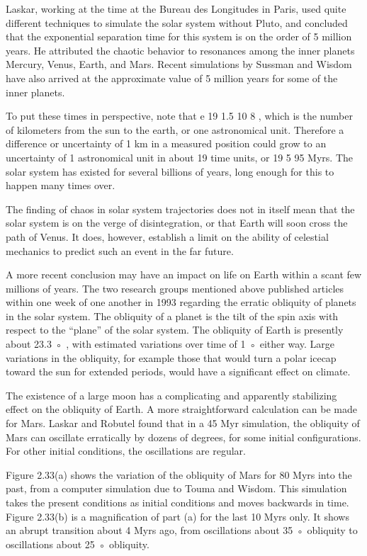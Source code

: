 \documentclass[12pt]{article}
\begin{document}
{Laskar, working at the time at the Bureau des Longitudes in Paris, used quite different techniques to simulate the solar system 
without Pluto, and concluded that the exponential separation time for this system is on the order of 5 million years. He attributed 
the chaotic behavior to resonances among the inner planets Mercury, Venus, Earth, and Mars. Recent simulations by Sussman and Wisdom 
have also arrived at the approximate value of 5 million years for some of the inner planets.

To put these times in perspective, note that e 19  1.5 10 8 , which is the number of kilometers from the sun to the earth, or one 
astronomical unit. Therefore a difference or uncertainty of 1 km in a measured position could grow to an uncertainty of 1 
astronomical unit in about 19 time units, or 19 5  95 Myrs. The solar system has existed for several billions of years, long enough 
for this to happen many times over.

The ﬁnding of chaos in solar system trajectories does not in itself mean that the solar system is on the verge of disintegration, or 
that Earth will soon cross the path of Venus. It does, however, establish a limit on the ability of celestial mechanics to predict 
such an event in the far future.

A more recent conclusion may have an impact on life on Earth within a scant few millions of years. The two research groups mentioned 
above published articles within one week of one another in 1993 regarding the erratic obliquity of planets in the solar system. The 
obliquity of a planet is the tilt of the spin axis with respect to the “plane” of the solar system. The obliquity of Earth is 
presently about 23.3 ◦ , with estimated variations over time of 1 ◦ either way. Large variations in the obliquity, for example 
those that would turn a polar icecap toward the sun for extended periods, would have a signiﬁcant effect on climate.

The existence of a large moon has a complicating and apparently stabilizing effect on the obliquity of Earth. A more straightforward 
calculation can be made for Mars. Laskar and Robutel found that in a 45 Myr simulation, the obliquity of Mars can oscillate 
erratically by dozens of degrees, for some initial conﬁgurations. For other initial conditions, the oscillations are regular.

Figure 2.33(a) shows the variation of the obliquity of Mars for 80 Myrs into the past, from a computer simulation due to Touma and 
Wisdom. This simulation takes the present conditions as initial conditions and moves backwards in time. Figure 2.33(b) is a 
magniﬁcation of part (a) for the last 10 Myrs only. It shows an abrupt transition about 4 Myrs ago, from oscillations about 35 ◦ 
obliquity to oscillations about 25 ◦ obliquity.

}
\end{document}
